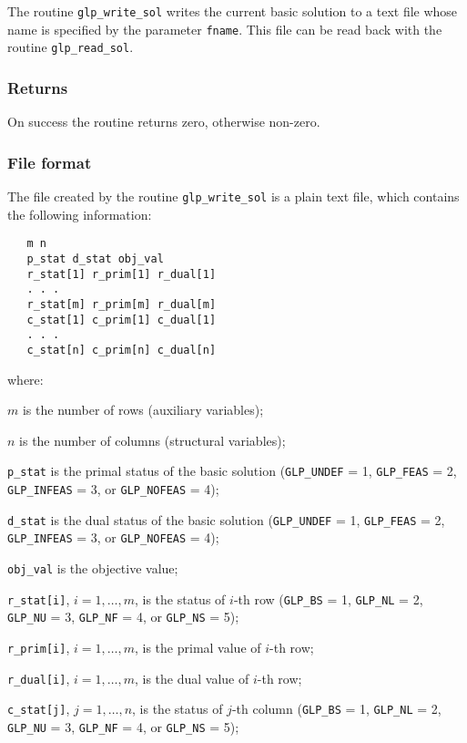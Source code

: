 The routine \verb|glp_write_sol| writes the current basic solution to a
text file whose name is specified by the parameter \verb|fname|. This
file can be read back with the routine \verb|glp_read_sol|.

\subsubsection*{Returns}

On success the routine returns zero, otherwise non-zero.

\subsubsection*{File format}

The file created by the routine \verb|glp_write_sol| is a plain text
file, which contains the following information:

\begin{verbatim}
   m n
   p_stat d_stat obj_val
   r_stat[1] r_prim[1] r_dual[1]
   . . .
   r_stat[m] r_prim[m] r_dual[m]
   c_stat[1] c_prim[1] c_dual[1]
   . . .
   c_stat[n] c_prim[n] c_dual[n]
\end{verbatim}

\noindent
where:

\noindent
$m$ is the number of rows (auxiliary variables);

\noindent
$n$ is the number of columns (structural variables);

\noindent
\verb|p_stat| is the primal status of the basic solution
(\verb|GLP_UNDEF| = 1, \verb|GLP_FEAS| = 2, \verb|GLP_INFEAS| = 3, or
\verb|GLP_NOFEAS| = 4);

\noindent
\verb|d_stat| is the dual status of the basic solution
(\verb|GLP_UNDEF| = 1, \verb|GLP_FEAS| = 2, \verb|GLP_INFEAS| = 3, or
\verb|GLP_NOFEAS| = 4);

\noindent
\verb|obj_val| is the objective value;

\noindent
\verb|r_stat[i]|, $i=1,\dots,m$, is the status of $i$-th row
(\verb|GLP_BS| = 1, \verb|GLP_NL| = 2, \verb|GLP_NU| = 3,
\verb|GLP_NF| = 4, or \verb|GLP_NS| = 5);

\noindent
\verb|r_prim[i]|, $i=1,\dots,m$, is the primal value of $i$-th row;

\noindent
\verb|r_dual[i]|, $i=1,\dots,m$, is the dual value of $i$-th row;

\noindent
\verb|c_stat[j]|, $j=1,\dots,n$, is the status of $j$-th column
(\verb|GLP_BS| = 1, \verb|GLP_NL| = 2, \verb|GLP_NU| = 3,
\verb|GLP_NF| = 4, or \verb|GLP_NS| = 5);

